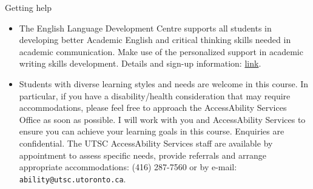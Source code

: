 \documentclass[ignorenonframetext,]{beamer}
\begin{document}
\begin{frame}[fragile]{Getting help}
\protect\hypertarget{getting-help}{}

\begin{itemize}
\item
  The English Language Development Centre supports all students in
  developing better Academic English and critical thinking skills needed
  in academic communication. Make use of the personalized support in
  academic writing skills development. Details and sign-up information:
  \href{http://www.utsc.utoronto.ca/eld/}{link}.
\item
  Students with diverse learning styles and needs are welcome in this
  course. In particular, if you have a disability/health consideration
  that may require accommodations, please feel free to approach the
  AccessAbility Services Office as soon as possible. I will work with
  you and AccessAbility Services to ensure you can achieve your learning
  goals in this course. Enquiries are confidential. The UTSC
  AccessAbility Services staff are available by appointment to assess
  specific needs, provide referrals and arrange appropriate
  accommodations: (416) 287-7560 or by e-mail:
  \texttt{ability@utsc.utoronto.ca}.
\end{itemize}

\end{frame}
\end{document}
